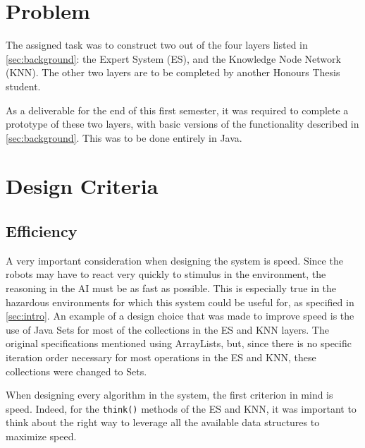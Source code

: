 \documentclass[titlepage,11pt]{article}
\newcommand{\code}[1]{\texttt{#1}}
\begin{document}
\section{Problem}

The assigned task was to construct two out of the four layers listed in \autoref{sec:background}: the Expert System (ES), and the Knowledge Node Network (KNN). The other two layers are to be completed by another Honours Thesis student.

As a deliverable for the end of this first semester, it was required to complete a prototype of these two layers, with basic versions of the functionality described in \autoref{sec:background}. This was to be done entirely in Java.

\section{Design Criteria}

\subsection{Efficiency}

A very important consideration when designing the system is speed. Since the robots may have to react very quickly to stimulus in the environment, the reasoning in the AI must be as fast as possible. This is especially true in the hazardous environments for which this system could be useful for, as specified in \autoref{sec:intro}. An example of a design choice that was made to improve speed is the use of Java Sets for most of the collections in the ES and KNN layers. The original specifications mentioned using ArrayLists, but, since there is no specific iteration order necessary for most operations in the ES and KNN, these collections were changed to Sets.

When designing every algorithm in the system, the first criterion in mind is speed. Indeed, for the \code{think()} methods of the ES and KNN, it was important to think about the right way to leverage all the available data structures to maximize speed.
\end{document}
